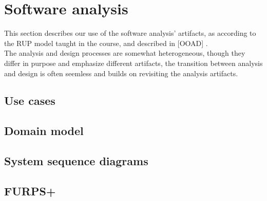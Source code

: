 \section{Software analysis}
\label{sec:software-analysis}
This section describes our use of the software analysis' artifacts, as according to the RUP model taught in the course, and described in [OOAD] \cite{Larman2011}.\\
The analysis and design processes are somewhat heterogeneous, though they differ in purpose and emphasize different artifacts, the transition between analysis and design is often seemless and builds on revisiting the analysis artifacts.

\subsection{Use cases}


\subsection{Domain model}


\subsection{System sequence diagrams}


\subsection{FURPS+}

